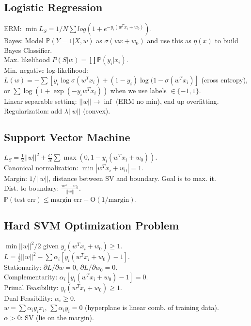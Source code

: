\subsection*{Logistic Regression}

ERM: $\min L_S = 1/N \sum log(1+e^{-y_i(w^T x_i + w_0)})$.\\
Bayes: Model $\mathbb{P}(Y=1|X, w)$ as $\sigma(w x +w_0)$ and use this as $\eta(x)$ to build Bayes Classifier.\\
Max. likelihood $P(S|w) = \prod \mathbb{P}(y_i|x_i)$.\\
Min. negative log-likelihood: $L(w) = -\sum[y_i \log \sigma(w^T x_i) + (1 - y_i) \log(1 - \sigma(w^T x_i)]$ (cross entropy), or $\sum \log(1 + \exp(-y_i w^T x_i))$ when we use labels $\in \{-1, 1\}$.\\
Linear separable setting: $||w|| \rightarrow \inf$ (ERM no min), end up overfitting.\\
Regularization: add $\lambda ||w||$ (convex).

\subsection*{Support Vector Machine}

$L_S = \frac{1}{2}||w||^2 + \frac{C}{N} \sum \max(0, 1-y_i(w^T x_i + w_0))$.\\
Canonical normalization: $\min |w^T x_i + w_0| = 1$.\\
Margin: $1/||w||$, distance between SV and boundary. Goal is to max. it.\\
Dist. to boundary: $\frac{w^x + w_0}{||w||}$.\\
$\mathbb{P}(\text{test err}) \leq \text{margin err} + \text{O}(1/\text{margin})$.

\subsection*{Hard SVM Optimization Problem}

$\min ||w||^2/2$ given $y_i(w^T x_i + w_0) \geq 1$.\\
$L = \frac{1}{2} ||w||^2 - \sum \alpha_i [y_i(w^T x_i + w_0) - 1]$.\\
Stationarity: ${\partial L}/{\partial w}=0$, ${\partial L}/{\partial w_0} = 0$.\\
Complementarity: $\alpha_i [y_i (w^T x_i + w_0) - 1] = 0$.\\
Primal Feasibility: $y_i (w^T x_i + w_0) \geq 1$.\\
Dual Feasibility: $\alpha_i \geq 0$.\\
$w = \sum \alpha_i y_i x_i$, $\sum \alpha_i y_i = 0$ (hyperplane is linear comb. of training data).\\
$\alpha > 0$: SV (lie on the margin).

